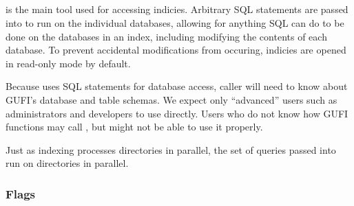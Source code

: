 \subsection{\gufiquery}

\gufiquery is the main tool used for accessing indicies. Arbitrary SQL
statements are passed into \gufiquery to run on the individual
databases, allowing for anything SQL can do to be done on the
databases in an index, including modifying the contents of each
database. To prevent accidental modifications from occuring, indicies
are opened in read-only mode by default.

Because \gufiquery uses SQL statements for database access, caller
will need to know about GUFI's database and table schemas. We expect
only ``advanced'' users such as administrators and developers to use
\gufiquery directly. Users who do not know how GUFI functions may call
\gufiquery, but might not be able to use it properly.

Just as indexing processes directories in parallel, the set of
queries passed into \gufiquery run on directories in parallel.

\subsubsection{Flags}

